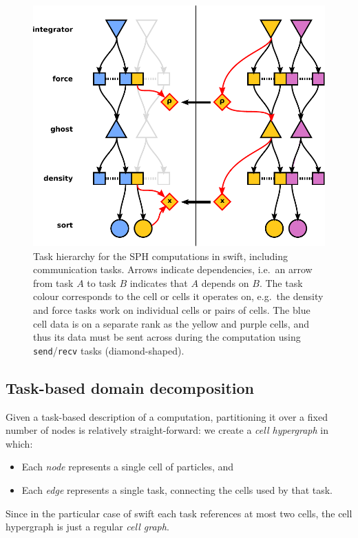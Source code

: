 \documentclass{sig-alternate-05-2015}
\newcommand{\swift}{{\sc swift}\xspace}
\begin{document}
\begin{figure}
\centering
\includegraphics[width=\columnwidth]{Figures/Hierarchy3}
\caption{Task hierarchy for the SPH computations in \swift,
  including communication tasks. Arrows indicate dependencies,
  i.e.~an arrow from task $A$ to task $B$ indicates that $A$
  depends on $B$. The task colour corresponds to the cell or
  cells it operates on, e.g.~the density and force tasks work
  on individual cells or pairs of cells.
  The blue cell data is on a separate rank as the yellow and
  purple cells, and thus its data must be sent across during
  the computation using {\tt send}/{\tt recv} tasks (diamond-shaped).}
\label{tasks}
\end{figure}  


\subsection{Task-based domain decomposition}

Given a task-based description of a computation, partitioning it over
a fixed number of nodes is relatively straight-forward: we create
a {\em cell hypergraph} in which:
\begin{itemize}
  \item Each {\em node} represents a single cell of particles, and
  \item Each {\em edge} represents a single task, connecting the
    cells used by that task.
\end{itemize}
Since in the particular case of \swift each task references at most
two cells, the cell hypergraph is just a regular {\em cell graph}.
\end{document}
